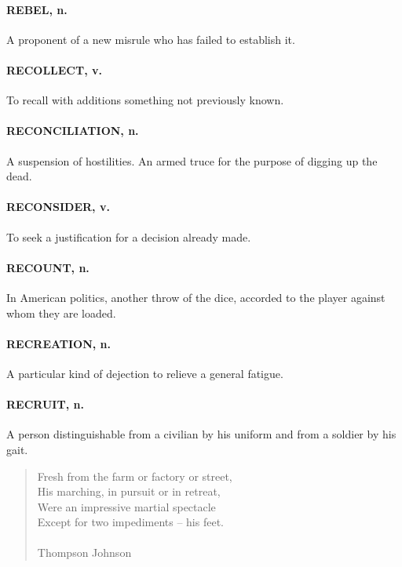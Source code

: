 \documentclass[11pt]{article}
\begin{document}
\paragraph{REBEL, n.}  A proponent of a new misrule who has failed to establish
it.

\paragraph{RECOLLECT, v.}  To recall with additions something not previously
known.

\paragraph{RECONCILIATION, n.}  A suspension of hostilities.  An armed truce for
the purpose of digging up the dead.

\paragraph{RECONSIDER, v.}  To seek a justification for a decision already made.

\paragraph{RECOUNT, n.}  In American politics, another throw of the dice, accorded
to the player against whom they are loaded.

\paragraph{RECREATION, n.}  A particular kind of dejection to relieve a general
fatigue.

\paragraph{RECRUIT, n.}  A person distinguishable from a civilian by his uniform
and from a soldier by his gait.

\begin{quote}   Fresh from the farm or factory or street, \\
  His marching, in pursuit or in retreat, \\
      Were an impressive martial spectacle \\
  Except for two impediments -- his feet. \\
 \\
Thompson Johnson \end{quote}
\end{document}

